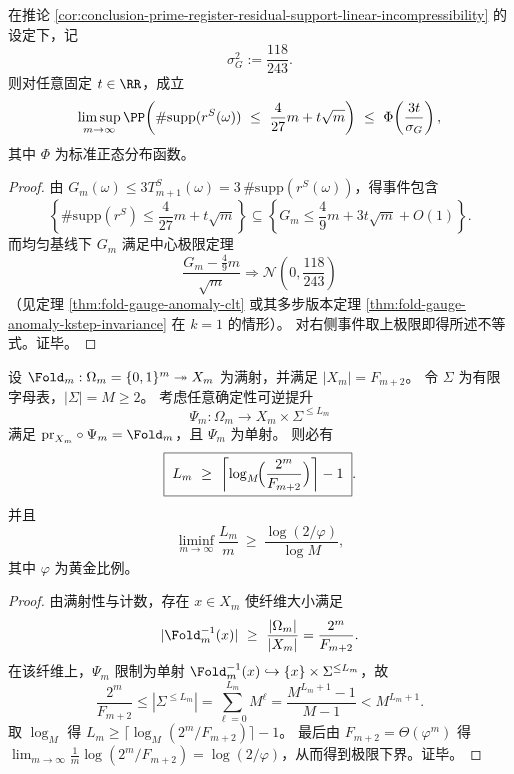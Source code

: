 \begin{corollary}\label{cor:conclusion-prime-register-residual-support-clt-quantified}
在推论 \ref{cor:conclusion-prime-register-residual-support-linear-incompressibility} 的设定下，记
\[
\sigma_G^2:=\frac{118}{243}.
\]
则对任意固定 \(t\in\RR\)，成立
\[
\limsup_{m\to\infty}
\PP\!\left(
\#\mathrm{supp}(r^{S}(\omega))
\ \le\
\frac{4}{27}m+t\sqrt m
\right)
\ \le\
\Phi\!\left(\frac{3t}{\sigma_G}\right),
\]
其中 \(\Phi\) 为标准正态分布函数。
\end{corollary}
\begin{proof}
由 \(G_m(\omega)\le 3T_{m+1}^{S}(\omega)=3\,\#\mathrm{supp}(r^{S}(\omega))\)，得事件包含
\[
\left\{\#\mathrm{supp}(r^{S})\le \frac{4}{27}m+t\sqrt m\right\}
\subseteq
\left\{G_m\le \frac49 m+3t\sqrt m+O(1)\right\}.
\]
而均匀基线下 \(G_m\) 满足中心极限定理
\[
\frac{G_m-\frac49 m}{\sqrt m}\Rightarrow \mathcal N\!\left(0,\frac{118}{243}\right)
\]
（见定理 \ref{thm:fold-gauge-anomaly-clt} 或其多步版本定理 \ref{thm:fold-gauge-anomaly-kstep-invariance} 在 \(k=1\) 的情形）。
对右侧事件取上极限即得所述不等式。证毕。
\end{proof}

\begin{theorem}\label{thm:conclusion-side-info-length-lower-bound}
设 \(\Fold_m:\Omega_m=\{0,1\}^m\twoheadrightarrow X_m\) 为满射，并满足 \(|X_m|=F_{m+2}\)。
令 \(\Sigma\) 为有限字母表，\(|\Sigma|=M\ge 2\)。
考虑任意确定性可逆提升
\[
\Psi_m:\Omega_m\longrightarrow X_m\times \Sigma^{\le L_m}
\]
满足 \(\mathrm{pr}_{X_m}\circ \Psi_m=\Fold_m\)，且 \(\Psi_m\) 为单射。
则必有
\[
\boxed{\;
L_m\ \ge\ \left\lceil \log_M\!\Bigl(\frac{2^m}{F_{m+2}}\Bigr)\right\rceil-1\; }.
\]
并且
\[
\liminf_{m\to\infty}\frac{L_m}{m}\ \ge\ \frac{\log(2/\varphi)}{\log M},
\]
其中 \(\varphi\) 为黄金比例。
\end{theorem}
\begin{proof}
由满射性与计数，存在 \(x\in X_m\) 使纤维大小满足
\[
|\Fold_m^{-1}(x)|\ \ge\ \frac{|\Omega_m|}{|X_m|}
=\frac{2^m}{F_{m+2}}.
\]
在该纤维上，\(\Psi_m\) 限制为单射
\(
\Fold_m^{-1}(x)\hookrightarrow \{x\}\times \Sigma^{\le L_m}
\)，故
\[
\frac{2^m}{F_{m+2}}
\le
|\Sigma^{\le L_m}|
=\sum_{\ell=0}^{L_m}M^\ell
=\frac{M^{L_m+1}-1}{M-1}
<M^{L_m+1}.
\]
取 \(\log_M\) 得
\(
L_m\ge \lceil \log_M(2^m/F_{m+2})\rceil-1
\)。
最后由 \(F_{m+2}=\Theta(\varphi^m)\) 得
\(
\lim_{m\to\infty}\frac1m\log(2^m/F_{m+2})=\log(2/\varphi)
\)，从而得到极限下界。证毕。
\end{proof}

